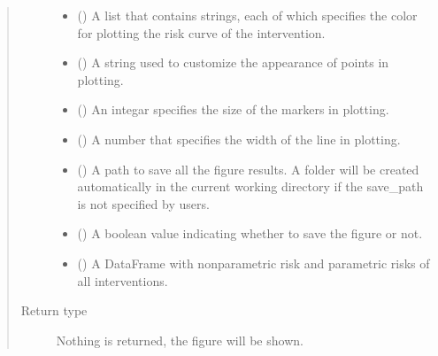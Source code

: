 \documentclass[letterpaper,10pt,english]{sphinxmanual}
\begin{document}
\begin{fulllineitems}
\begin{quote}
\begin{description}
\begin{itemize}
\item {} 
\sphinxAtStartPar
{} () \textendash{} A list that contains strings, each of which specifies the color for plotting the risk curve of the intervention.

\item {} 
\sphinxAtStartPar
{} () \textendash{} A string used to customize the appearance of points in plotting.

\item {} 
\sphinxAtStartPar
{} () \textendash{} An integar specifies the size of the markers in plotting.

\item {} 
\sphinxAtStartPar
{} () \textendash{} A number that specifies the width of the line in plotting.

\item {} 
\sphinxAtStartPar
{} () \textendash{} A path to save all the figure results. A folder will be created automatically in the current working directory
if the save\_path is not specified by users.

\item {} 
\sphinxAtStartPar
{} () \textendash{} A boolean value indicating whether to save the figure or not.

\item {} 
\sphinxAtStartPar
{} () \textendash{} A DataFrame with nonparametric risk and parametric risks of all interventions.

\end{itemize}

\item[{Return type}] \leavevmode
\sphinxAtStartPar
Nothing is returned, the figure will be shown.

\end{description}\end{quote}

\end{fulllineitems}
\end{document}
